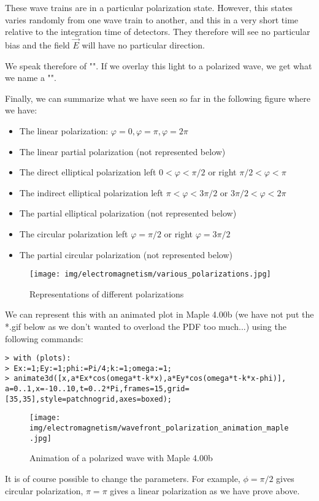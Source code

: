 	These wave trains are in a particular polarization state. However, this states varies randomly from one wave train to another, and this in a very short time relative to the integration time of detectors. They therefore will see no particular bias and the field $\vec{E}$ will have no particular direction.

	We speak therefore of "". If we overlay this light to a polarized wave, we get what we name a "".
	
	Finally, we can summarize what we have seen so far in the following figure where we have:
	\begin{itemize}
		\item The linear polarization: $\varphi=0,\varphi=\pi,\varphi=2\pi$

		\item The linear partial polarization (not represented below)

		\item The direct elliptical polarization left $0<\varphi<\pi/2$ or right $\pi/2<\varphi<\pi$

		\item The indirect elliptical polarization left $\pi<\varphi<3\pi/2$ or $3\pi/2<\varphi <2\pi$

		\item The partial elliptical polarization (not represented below)

		\item The circular polarization left $\varphi=\pi/2$ or right $\varphi=3\pi/2$

		\item The partial circular polarization (not represented below)
	\end{itemize}
	\begin{figure}[H]
		\centering
		\texttt{[image: img/electromagnetism/various\_polarizations.jpg]}
		\caption{Representations of different polarizations}
	\end{figure}
	
	We can represent this with an animated plot in Maple 4.00b (we have not put the *.gif below as we don't wanted to overload the PDF too much...) using the following commands:
	
	\texttt{> with (plots):\\
	> Ex:=1;Ey:=1;phi:=Pi/4;k:=1;omega:=1;\\
	> animate3d([x,a*Ex*cos(omega*t-k*x),a*Ey*cos(omega*t-k*x-phi)],\\
	a=0..1,x=-10..10,t=0..2*Pi,frames=15,grid=[35,35],style=patchnogrid,axes=boxed);}
	\begin{figure}[H]
		\centering
		\texttt{[image: img/electromagnetism/wavefront\_polarization\_animation\_maple.jpg]}
		\caption{Animation of a polarized wave with Maple 4.00b}
	\end{figure}
	It is of course possible to change the parameters. For example, $\phi=\pi/2$ gives circular polarization, $\pi=\pi$ gives a linear polarization as we have prove above.

